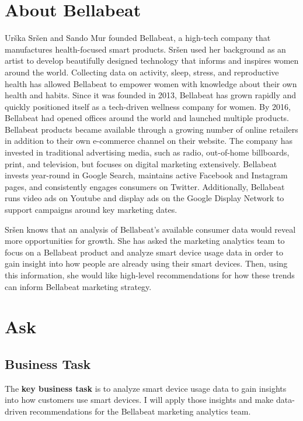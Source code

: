 \documentclass[
]{article}
\begin{document}
\hypertarget{about-bellabeat}{%
\section{About Bellabeat}\label{about-bellabeat}}

Urška Sršen and Sando Mur founded Bellabeat, a high-tech company that
manufactures health-focused smart products. Sršen used her background as
an artist to develop beautifully designed technology that informs and
inspires women around the world. Collecting data on activity, sleep,
stress, and reproductive health has allowed Bellabeat to empower women
with knowledge about their own health and habits. Since it was founded
in 2013, Bellabeat has grown rapidly and quickly positioned itself as a
tech-driven wellness company for women. By 2016, Bellabeat had opened
offices around the world and launched multiple products. Bellabeat
products became available through a growing number of online retailers
in addition to their own e-commerce channel on their website. The
company has invested in traditional advertising media, such as radio,
out-of-home billboards, print, and television, but focuses on digital
marketing extensively. Bellabeat invests year-round in Google Search,
maintains active Facebook and Instagram pages, and consistently engages
consumers on Twitter. Additionally, Bellabeat runs video ads on Youtube
and display ads on the Google Display Network to support campaigns
around key marketing dates.

Sršen knows that an analysis of Bellabeat's available consumer data
would reveal more opportunities for growth. She has asked the marketing
analytics team to focus on a Bellabeat product and analyze smart device
usage data in order to gain insight into how people are already using
their smart devices. Then, using this information, she would like
high-level recommendations for how these trends can inform Bellabeat
marketing strategy.

\hypertarget{ask}{%
\section{Ask}\label{ask}}

\hypertarget{business-task}{%
\subsection{Business Task}\label{business-task}}

The \textbf{key business task} is to analyze smart device usage data to
gain insights into how customers use smart devices. I will apply those
insights and make data-driven recommendations for the Bellabeat
marketing analytics team.
\end{document}
